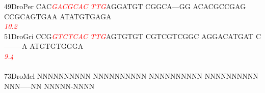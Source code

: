 \documentclass[11pt,twoside,reqno,a4paper]{article}
\begin{document}
{49\hspace*{2\charwidth}DroPer	CAC\textit{\textcolor{Red}{G}}\textit{\textcolor{Red}{A}}\textit{\textcolor{Red}{C}}\textit{\textcolor{Red}{G}}\textit{\textcolor{Red}{C}}\textit{\textcolor{Red}{A}}\textit{\textcolor{Red}{C}}	\textit{\textcolor{Red}{T}}\textit{\textcolor{Red}{T}}\textit{\textcolor{Red}{G}}AGGATGT	CGGCA---GG	ACACGCCGAG	CCGCAGTGAA	ATATGTGAGA	\\
\hspace*{4\charwidth}\hspace*{7\charwidth}\hspace*{3\charwidth}\textit{\textcolor{Red}{10.2}}\hspace*{1\charwidth}\hspace*{1\charwidth}\hspace*{1\charwidth}\hspace*{1\charwidth}\hspace*{1\charwidth}\hspace*{1\charwidth}\\
51\hspace*{2\charwidth}DroGri	CCG\textit{\textcolor{Red}{G}}\textit{\textcolor{Red}{T}}\textit{\textcolor{Red}{C}}\textit{\textcolor{Red}{T}}\textit{\textcolor{Red}{C}}\textit{\textcolor{Red}{A}}\textit{\textcolor{Red}{C}}	\textit{\textcolor{Red}{T}}\textit{\textcolor{Red}{T}}\textit{\textcolor{Red}{G}}AGTGTGT	CGTCGTCGGC	AGGACATGAT	C--------A	ATGTGTGGGA	\\
\hspace*{4\charwidth}\hspace*{7\charwidth}\hspace*{3\charwidth}\textit{\textcolor{Red}{9.4}}\hspace*{1\charwidth}\hspace*{1\charwidth}\hspace*{1\charwidth}\hspace*{1\charwidth}\hspace*{1\charwidth}\hspace*{1\charwidth}\\
\\
73\hspace*{2\charwidth}DroMel	NNNNNNNNNN	NNNNNNNNNN	NNNNNNNNNN	NNNNNNNNNN	NNN-----NN	NNNNN-NNNN	\\
\hspace*{4\charwidth}\hspace*{7\charwidth}\hspace*{1\charwidth}\hspace*{1\charwidth}\hspace*{1\charwidth}\hspace*{1\charwidth}\hspace*{1\charwidth}\hspace*{1\charwidth}\\
}
\end{document}
